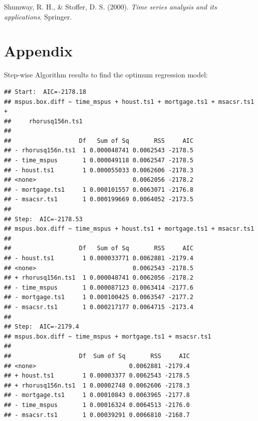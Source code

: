 \documentclass[
  man]{apa6}
\newlength{\cslhangindent}
\newenvironment{CSLReferences}[2] %
 {\begin{list}{}{%
  \setlength{\itemindent}{0pt}
  \setlength{\leftmargin}{0pt}
  \setlength{\parsep}{0pt}
  \ifodd #1
   \setlength{\leftmargin}{\cslhangindent}
   \setlength{\itemindent}{-1\cslhangindent}
  \fi
  \setlength{\itemsep}{#2\baselineskip}}}
 {\end{list}}
\begin{document}
\label{refs}
\begin{CSLReferences}{1}{0}
Shumway, R. H., \& Stoffer, D. S. (2000). \emph{Time series analysis and its applications}. Springer.

\end{CSLReferences}

\section{Appendix}\label{appendix}

Step-wise Algorithm results to find the optimum regression model:

\begin{verbatim}
## Start:  AIC=-2178.18
## mspus.box.diff ~ time_mspus + houst.ts1 + mortgage.ts1 + msacsr.ts1 + 
##     rhorusq156n.ts1
## 
##                   Df   Sum of Sq       RSS     AIC
## - rhorusq156n.ts1  1 0.000048741 0.0062543 -2178.5
## - time_mspus       1 0.000049118 0.0062547 -2178.5
## - houst.ts1        1 0.000055033 0.0062606 -2178.3
## <none>                           0.0062056 -2178.2
## - mortgage.ts1     1 0.000101557 0.0063071 -2176.8
## - msacsr.ts1       1 0.000199669 0.0064052 -2173.5
## 
## Step:  AIC=-2178.53
## mspus.box.diff ~ time_mspus + houst.ts1 + mortgage.ts1 + msacsr.ts1
## 
##                   Df   Sum of Sq       RSS     AIC
## - houst.ts1        1 0.000033771 0.0062881 -2179.4
## <none>                           0.0062543 -2178.5
## + rhorusq156n.ts1  1 0.000048741 0.0062056 -2178.2
## - time_mspus       1 0.000087123 0.0063414 -2177.6
## - mortgage.ts1     1 0.000100425 0.0063547 -2177.2
## - msacsr.ts1       1 0.000217177 0.0064715 -2173.4
## 
## Step:  AIC=-2179.4
## mspus.box.diff ~ time_mspus + mortgage.ts1 + msacsr.ts1
## 
##                   Df  Sum of Sq       RSS     AIC
## <none>                          0.0062881 -2179.4
## + houst.ts1        1 0.00003377 0.0062543 -2178.5
## + rhorusq156n.ts1  1 0.00002748 0.0062606 -2178.3
## - mortgage.ts1     1 0.00010843 0.0063965 -2177.8
## - time_mspus       1 0.00016324 0.0064513 -2176.0
## - msacsr.ts1       1 0.00039291 0.0066810 -2168.7
\end{verbatim}
\end{document}
